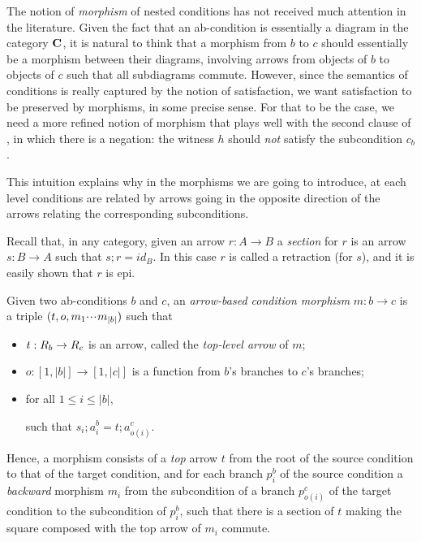 The notion of \emph{morphism} of nested conditions has not received much attention in the literature. Given the fact that an ab-condition is essentially a diagram in the category $\mathbf{C}$, it is natural to think that a morphism from $b$ to $c$ should essentially be a morphism between their diagrams, involving arrows from objects of $b$ to objects of $c$ such that all subdiagrams commute. However, since the semantics of conditions is really captured by the notion of satisfaction, we want satisfaction to be preserved by morphisms, in some precise sense. For that to be the case, we need a more refined notion of morphism that plays well with the second clause of , in which there is a negation: the witness $h$ should \emph{not} satisfy the subcondition $c_b$. 

This intuition explains why in the morphisms we are going to introduce, at each level conditions are related by arrows going in the opposite direction of the arrows relating the corresponding subconditions.  

Recall that, in any category, given an arrow $r: A \to B$ a \emph{section} for $r$ is an arrow $s: B \to A$ such that $s;r = id_B$. In this case $r$ is called a retraction (for $s$), and it is easily shown that $r$ is epi.

\begin{definition}
  Given two ab-conditions $b$ and $c$, an \emph{arrow-based condition morphism} $m: b \to c$ is a triple $(t,o,m_1{\cdotp\mkern-2mu\cdotp\mkern-2mu\cdotp\mkern1mu} m_{|b|})$ such that   
  \begin{itemize}
    \item $t:R_b\rightarrow R_c$ is an arrow, called the \emph{top-level arrow} of $m$;
	\item $o:[1,|b|]\to[1,|c|]$ is a function from $b$'s branches to $c$'s branches;
  \item for all $1\leq i\leq |b|$,
	such that $s_i;a^b_i=t;a^c_{o(i)}$.
\end{itemize}
\end{definition}
%
Hence, a morphism consists of a \emph{top} arrow $t$ from the root of the source condition to that of the target condition, and for each branch $p^b_i$ of the source condition a \emph{backward} morphism $m_i$ from the subcondition of a branch $p^c_{o(i)}$ of the target condition to the subcondition of $p^b_i$, such that there is a section of $t$ making the square composed with the top arrow of $m_i$ commute.

